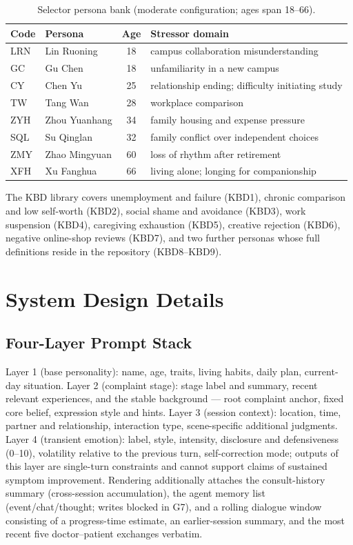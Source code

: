\documentclass[10pt]{article}
\begin{document}
\begin{table}[h]
\centering
\caption{Selector persona bank (moderate configuration; ages span 18--66).}
\label{tab:personas}
\small
\begin{tabular}{@{}llcl@{}}
\toprule
Code & Persona & Age & Stressor domain \\
\midrule
LRN & Lin Ruoning & 18 & campus collaboration misunderstanding \\
GC  & Gu Chen & 18 & unfamiliarity in a new campus \\
CY  & Chen Yu & 25 & relationship ending; difficulty initiating study \\
TW  & Tang Wan & 28 & workplace comparison \\
ZYH & Zhou Yuanhang & 34 & family housing and expense pressure \\
SQL & Su Qinglan & 32 & family conflict over independent choices \\
ZMY & Zhao Mingyuan & 60 & loss of rhythm after retirement \\
XFH & Xu Fanghua & 66 & living alone; longing for companionship \\
\bottomrule
\end{tabular}
\end{table}

The KBD library covers unemployment and failure (KBD1), chronic comparison and low self-worth (KBD2), social shame and avoidance (KBD3), work suspension (KBD4), caregiving exhaustion (KBD5), creative rejection (KBD6), negative online-shop reviews (KBD7), and two further personas whose full definitions reside in the repository (KBD8--KBD9).

\section{System Design Details}\label{app:details}

\subsection{Four-Layer Prompt Stack}

Layer 1 (base personality): name, age, traits, living habits, daily plan, current-day situation.
Layer 2 (complaint stage): stage label and summary, recent relevant experiences, and the stable background --- root complaint anchor, fixed core belief, expression style and hints.
Layer 3 (session context): location, time, partner and relationship, interaction type, scene-specific additional judgments.
Layer 4 (transient emotion): label, style, intensity, disclosure and defensiveness (0--10), volatility relative to the previous turn, self-correction mode; outputs of this layer are single-turn constraints and cannot support claims of sustained symptom improvement.
Rendering additionally attaches the consult-history summary (cross-session accumulation), the agent memory list (event/chat/thought; writes blocked in G7), and a rolling dialogue window consisting of a progress-time estimate, an earlier-session summary, and the most recent five doctor--patient exchanges verbatim.
\end{document}
